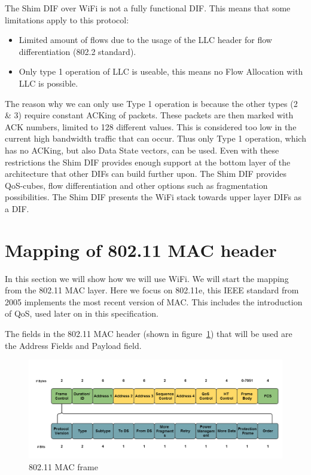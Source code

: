 The Shim DIF over WiFi is not a fully functional DIF. This means that some limitations apply to this protocol:

\begin{itemize}
	\item Limited amount of flows due to the usage of the LLC header for flow differentiation (802.2 standard\citep{ieee8022std}).
	\item Only type 1 operation of LLC is useable, this means no Flow Allocation with LLC is possible.
\end{itemize}

The reason why we can only use Type 1 operation is because the other types (2 \& 3) require constant ACKing of packets. These packets are then marked with ACK numbers, limited to 128 different values. This is considered too low in the current high bandwidth traffic that can occur. Thus only Type 1 operation, which has no ACKing, but also Data State vectors, can be used. Even with these restrictions the Shim DIF provides enough support at the bottom layer of the architecture that other DIFs can build further upon. The Shim DIF provides QoS-cubes, flow differentiation and other options such as fragmentation possibilities. The Shim DIF presents the WiFi stack towards upper layer DIFs as a DIF.

\section{Mapping of 802.11 MAC header}

In this section we will show how we will use WiFi. We will start the mapping from the 802.11 MAC layer. Here we focus on 802.11e, this IEEE standard from 2005 implements the most recent version of MAC. This includes the introduction of QoS, used later on in this specification. 

\npar

The fields in the 802.11 MAC header (shown in figure~\ref{fig:80211macframe}) that will be used are the Address Fields and Payload field.

\begin{figure}[H]
    \centering
    \includegraphics[width=1\textwidth]{figures/80211macframe}
    \caption{802.11 MAC frame} 
    \label{fig:80211macframe}
\end{figure}

